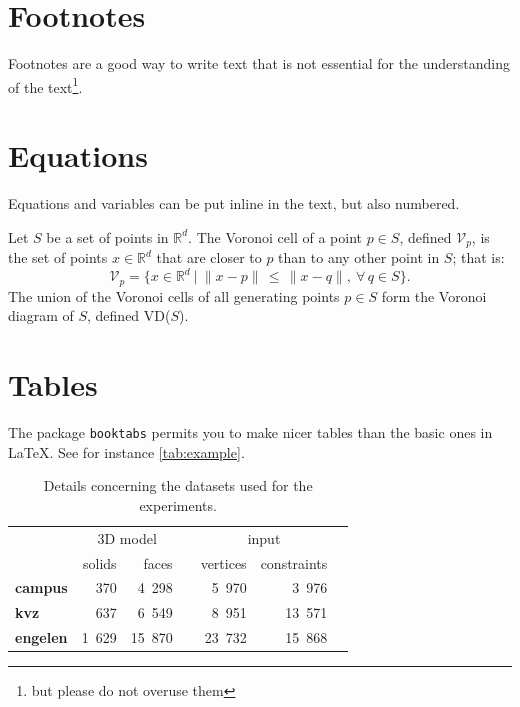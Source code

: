 %
\section{Footnotes}

Footnotes are a good way to write text that is not essential for the understanding of the text\footnote{but please do not overuse them}.

%
\section{Equations}

Equations and variables can be put inline in the text, but also numbered.

Let $S$ be a set of points in $\mathbb{R}^d$. 
The Voronoi cell of a point $p \in S$, defined $\mathcal{V}_{p}$, is the set of points $x \in \mathbb{R}^d$ that are closer to $p$ than to any other point in $S$; that is:
\begin{equation}
\mathcal{V}_p = \{x \in \mathbb{R}^{d} \ | \ \|x-p\| \, \leq \, \|x-q\|, \ \forall \, q \in S \}. 
\end{equation}
The union of the Voronoi cells of all generating points $p \in S$ form the Voronoi diagram of $S$, defined VD($S$).



%
\section{Tables}

The package \texttt{booktabs} permits you to make nicer tables than the basic ones in \LaTeX.
See for instance \autoref{tab:example}.
\begin{table}
  \centering
  \begin{tabular}{@{}lrrcrrc@{}} \toprule
    & \multicolumn{2}{c}{3D model} && \multicolumn{2}{c}{input} \\
    \cmidrule{2-3}  \cmidrule{5-6} 
    & solids & faces && vertices & constraints  \\ 
    \toprule
    \textbf{campus}  & 370   & 4~298  && 5~970  & 3~976   \\
    \textbf{kvz}     & 637   & 6~549  && 8~951  & 13~571  \\
    \textbf{engelen} & 1~629 & 15~870 && 23~732 & 15~868 \\ 
    \bottomrule
   \end{tabular}
  \caption{Details concerning the datasets used for the experiments.}
\label{tab:example}
\end{table}


